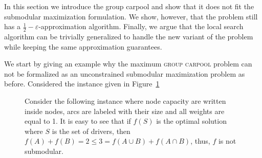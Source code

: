 In this section we introduce the group carpool and show that it does not fit the
submodular maximization formulation.
We show, however, that the problem still has a 
$\frac{1}{2} - \varepsilon$-approximation algorithm.
Finally, we argue that the local search algorithm can be trivially generalized
to handle the new variant of the problem while keeping the same approximation
guarantees.

We start by giving an example why the maximum \textsc{group carpool} problem can
not be formalized as an unconstrained submodular maximization problem as
before.
Considered the instance given in Figure~\ref{fig:not submodular}

\begin{figure}
\caption{
\label{fig:not submodular}
Consider the following instance where node capacity are written inside nodes, 
arcs are labeled with their size and all weights are equal to 1.
It is easy to see that if $f(S)$ is the optimal solution where $S$ is the set of
drivers, then $f(A) + f(B) = 2 \leq 3 = f(A \cup B) + f(A \cap B)$,
thus, $f$ is not submodular. 
}
\begin{center}

\end{center}
\end{figure}
